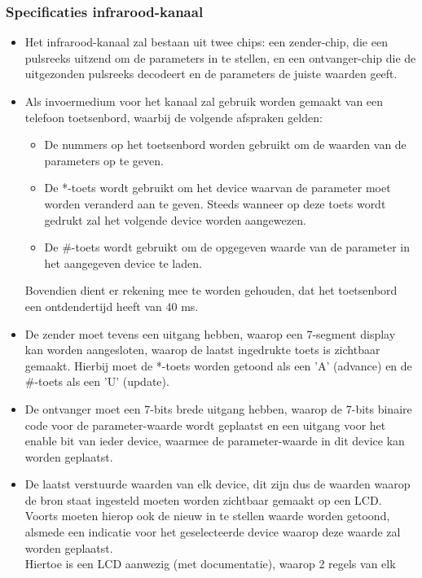 \subsubsection{Specificaties infrarood-kanaal}
\begin{itemize}
\item Het infrarood-kanaal zal bestaan uit twee chips: een zender-chip,
      die een pulsreeks uitzend om de parameters in te stellen, en een
      ontvanger-chip die de uitgezonden pulsreeks decodeert en de
      parameters de juiste waarden geeft.
\item Als invoermedium voor het kanaal zal gebruik worden gemaakt van een
      telefoon toetsenbord, waarbij de volgende afspraken gelden:
      \begin{itemize}
      \item De nummers op het toetsenbord worden gebruikt om de waarden van
            de parameters op te geven.
      \item De *-toets wordt gebruikt om het device waarvan de parameter
            moet worden veranderd aan te geven. Steeds wanneer op deze
            toets wordt gedrukt zal het volgende device worden aangewezen.
      \item De \#-toets wordt gebruikt om de opgegeven waarde van de parameter
            in het aangegeven device te laden.
      \end{itemize}
      Bovendien dient er rekening mee te worden gehouden, dat het toetsenbord
      een ontdendertijd heeft van 40 ms.
\item De zender moet tevens een uitgang hebben, waarop een 7-segment display
      kan worden aangesloten, waarop de laatst ingedrukte toets is zichtbaar
      gemaakt. Hierbij moet de *-toets worden getoond als een 'A' (advance) en
      de \#-toets als een 'U' (update).
\item De ontvanger moet een 7-bits brede uitgang hebben,
      waarop de 7-bits binaire code
      voor de parameter-waarde wordt geplaatst en een uitgang voor het
      enable bit van ieder device, waarmee de parameter-waarde in dit device
      kan worden geplaatst.
\item De laatst verstuurde waarden van elk device, dit zijn dus de waarden
      waarop de bron staat ingesteld moeten worden zichtbaar gemaakt op een
      LCD. Voorts moeten hierop ook de nieuw in te stellen waarde worden
      getoond, alsmede een indicatie voor het geselecteerde device waarop
      deze waarde zal worden geplaatst.\\ 
      Hiertoe is een LCD aanwezig (met documentatie), waarop  2 regels van elk

\end{itemize}
